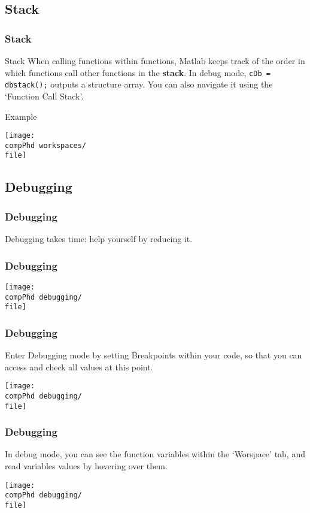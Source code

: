 \documentclass[]{beamer} %
\def\pathbase{/Users/pmxal9/} 	%
\def\pathbase{/Users/pmaal/} 	%
\edef\drop{\pathbase Dropbox/}		%
\edef\compPhd{\drop Nottingham/repos/phd/Seminars/+MatlabComputationalPhD/}
\begin{document}
\subsection{Stack}
\begin{frame}[fragile]
\frametitle{Stack}\centering
\begin{block}{Stack}%
When calling functions within functions, Matlab keeps track of the order in which functions call other functions in the \textbf{stack}.
In debug mode, \verb+cDb = dbstack();+ outputs a structure array. 
You can also navigate it using the `Function Call Stack'.
\end{block}
\def\file{functioncallstack}
\begin{exampleblock}{Example}%
	\begin{center}\texttt{[image: \\compPhd workspaces/\\file]}\end{center}
\end{exampleblock}
\end{frame}


\subsection{Debugging}
\begin{frame}[fragile]
\frametitle{Debugging}
Debugging takes time: help yourself by reducing it. 
\end{frame}


\begin{frame}[fragile]
\frametitle{Debugging}
\def\file{googletime}
\begin{center}\texttt{[image: \\compPhd debugging/\\file]}\end{center}
\end{frame}


\begin{frame}[fragile]
\frametitle{Debugging}
Enter Debugging mode by setting Breakpoints within your code, so that you can access and check all values at this point. 
\def\file{debugclick}
\begin{center}\texttt{[image: \\compPhd debugging/\\file]}\end{center}
\end{frame}


\begin{frame}[fragile]
\frametitle{Debugging}
In debug mode, you can see the function variables within the `Worspace' tab, and read variables values by hovering over them.\\%
\def\file{debug2}%
\begin{center}\hspace{0mm}\texttt{[image: \\compPhd debugging/\\file]}\end{center}
\end{frame}
\end{document}
